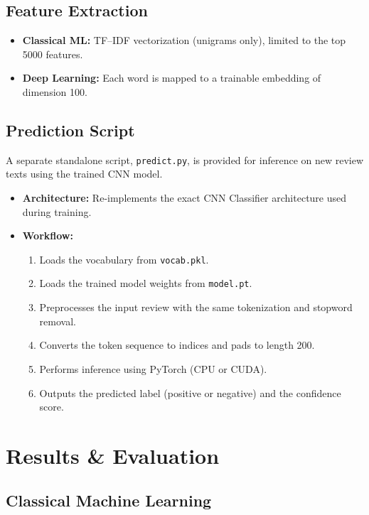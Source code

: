 \documentclass[12pt,a4paper]{article}
\begin{document}
\subsection{Feature Extraction}
\begin{itemize}
  \item \textbf{Classical ML:} TF–IDF vectorization (unigrams only), limited to the top 5000 features.
  \item \textbf{Deep Learning:} Each word is mapped to a trainable embedding of dimension 100.
\end{itemize}

\subsection{Prediction Script}
A separate standalone script, \texttt{predict.py}, is provided for inference on new review texts using the trained CNN model.

\begin{itemize}
  \item \textbf{Architecture:} Re-implements the exact CNN Classifier architecture used during training.
  \item \textbf{Workflow:}
    \begin{enumerate}
      \item Loads the vocabulary from \texttt{vocab.pkl}.
      \item Loads the trained model weights from \texttt{model.pt}.
      \item Preprocesses the input review with the same tokenization and stopword removal.
      \item Converts the token sequence to indices and pads to length 200.
      \item Performs inference using PyTorch (CPU or CUDA).
      \item Outputs the predicted label (positive or negative) and the confidence score.
    \end{enumerate}
\end{itemize}

\section{Results \& Evaluation}
\subsection{Classical Machine Learning}
\end{document}
